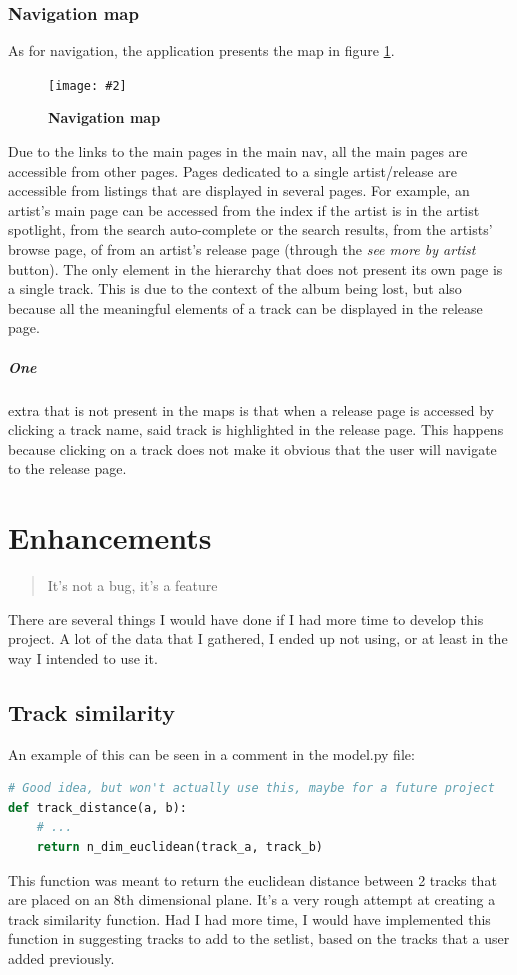 \documentclass[10pt, a4paper]{article}
\newcommand{\figuremacro}[5]{
    \begin{figure}[#1]
        \centering
        \texttt{[image: \#2]}
        \caption[#3]{\textbf{#3}#4}
        \label{fig:#2}
    \end{figure}
}
\begin{document}
	 \subsubsection{Navigation map}
	 As for navigation, the application presents the map in figure \ref{fig:nav-map}.
	 
	 \figuremacro{h}{nav-map}{Navigation map}{}{1.0}
	 
	 Due to the links to the main pages in the main nav, all the main pages are accessible from other pages. Pages dedicated to a single artist/release are accessible from listings that are displayed in several pages.
	 For example, an artist's main page can be accessed from the index if the artist is in the artist spotlight, from the search auto-complete or the search results, from the artists' browse page, of from an artist's release page (through the \textit{see more by artist} button).
	 The only element in the hierarchy that does not present its own page is a single track. This is due to the context of the album being lost, but also because all the meaningful elements of a track can be displayed in the release page.
	 \subparagraph{One} extra that is not present in the maps is that when a release page is accessed by clicking a track name, said track is highlighted in the release page. This happens because clicking on a track does not make it obvious that the user will navigate to the release page.
	 
\section{Enhancements}
\blockquote{It's not a bug, it's a feature}

	There are several things I would have done if I had more time to develop this project. A lot of the data that I gathered, I ended up not using, or at least in the way I intended to use it. 
	
	\subsection{Track similarity}	
	An example of this can be seen in a comment in the model.py file:
\begin{lstlisting}[language = Python, caption = Track distance function definition]
# Good idea, but won't actually use this, maybe for a future project
def track_distance(a, b):
	# ...
	return n_dim_euclidean(track_a, track_b)
\end{lstlisting} 
	This function was meant to return the euclidean distance between 2 tracks that are placed on an 8th dimensional plane. It's a very rough attempt at creating a track similarity function. Had I had more time, I would have implemented this function in suggesting tracks to add to the setlist, based on the tracks that a user added previously.
\end{document}
